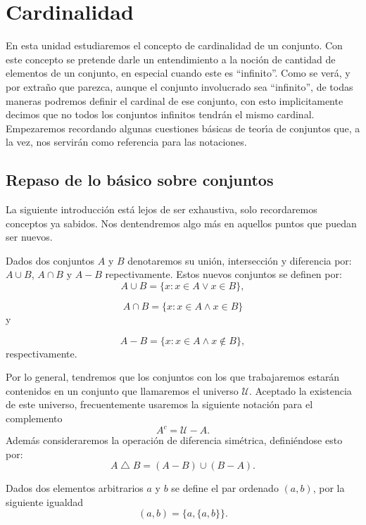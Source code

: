 
\chapter{Cardinalidad} En esta unidad estudiaremos el concepto de
cardinalidad de un conjunto. Con este concepto se pretende darle
un entendimiento a la noci\'on de cantidad de elementos de un
conjunto, en especial cuando este es ``infinito''. Como se ver\'a,
y por extra\~no que parezca, aunque el conjunto involucrado sea
``infinito'', de todas maneras podremos definir el cardinal de ese
conjunto, con esto implicitamente decimos que no todos los
conjuntos infinitos tendr\'an el mismo cardinal. Empezaremos
recordando algunas cuestiones b\'asicas de teor\'{\i}a de
conjuntos que, a la vez, nos servir\'an como referencia para  las
notaciones.





\section{Repaso de lo b\'asico sobre conjuntos}
La siguiente introducci\'on est\'a lejos de ser exhaustiva, solo
recordaremos conceptos ya sabidos. Nos dentendremos algo m\'as en
aquellos puntos que puedan ser nuevos.

\begin{definicion}Dados dos conjuntos $A$ y $B$ denotaremos su uni\'on,
intersecci\'on y diferencia por: $A\cup B$, $A\cap B$ y $A-B$
repectivamente. Estos nuevos conjuntos se definen por:
\[A\cup B=\{x:x\in A\vee x\in B\},\]

\[A\cap B=\{x:x\in A\wedge x\in B\}\]
y

\[A-B=\{x:x\in A \wedge x\notin B\},\]
respectivamente.
\end{definicion}
 Por lo general, tendremos que los
conjuntos con los que trabajaremos estar\'an contenidos en un
conjunto que llamaremos el universo $\mathcal{U}$. Aceptado la
existencia de este universo, frecuentemente usaremos la siguiente
notaci\'on para el complemento
\[A^c=\mathcal{U}-A.\]
Adem\'as consideraremos la operaci\'on de diferencia sim\'etrica,
defini\'endose esto por:
\[A\bigtriangleup B=(A-B)\cup(B-A).\]

\begin{definicion}Dados dos elementos arbitrarios $a$ y $b$ se
define el par ordenado $(a,b)$, por la siguiente igualdad
\[(a,b)=\{a,\{a,b\}\}.\]
\end{definicion}

